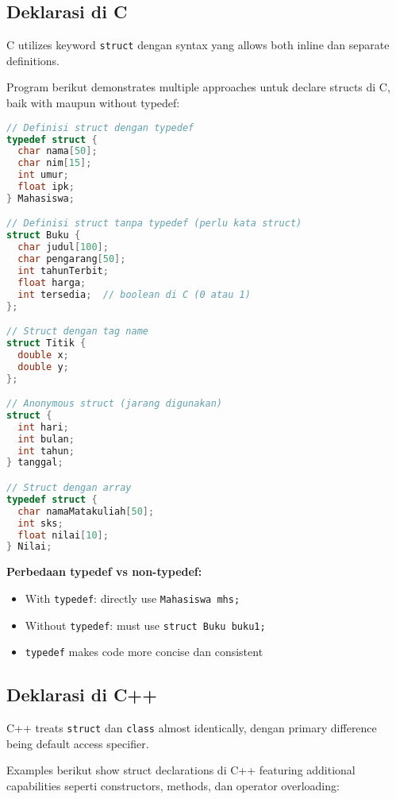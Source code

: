 \documentclass[../main.tex]{subfiles}
\begin{document}
\subsection{Deklarasi di C}

C utilizes keyword \texttt{struct} dengan syntax yang allows both inline dan separate definitions.

Program berikut demonstrates multiple approaches untuk declare structs di C, baik with maupun without typedef:

\begin{lstlisting}[language=C, caption={Deklarasi struct di C}]
// Definisi struct dengan typedef
typedef struct {
  char nama[50];
  char nim[15];
  int umur;
  float ipk;
} Mahasiswa;

// Definisi struct tanpa typedef (perlu kata struct)
struct Buku {
  char judul[100];
  char pengarang[50];
  int tahunTerbit;
  float harga;
  int tersedia;  // boolean di C (0 atau 1)
};

// Struct dengan tag name
struct Titik {
  double x;
  double y;
};

// Anonymous struct (jarang digunakan)
struct {
  int hari;
  int bulan;
  int tahun;
} tanggal;

// Struct dengan array
typedef struct {
  char namaMatakuliah[50];
  int sks;
  float nilai[10];
} Nilai;
\end{lstlisting}

\textbf{Perbedaan typedef vs non-typedef:}
\begin{itemize}
  \item With \texttt{typedef}: directly use \texttt{Mahasiswa mhs;}
  \item Without \texttt{typedef}: must use \texttt{struct Buku buku1;}
  \item \texttt{typedef} makes code more concise dan consistent
\end{itemize}

\subsection{Deklarasi di C++}

C++ treats \texttt{struct} dan \texttt{class} almost identically, dengan primary difference being default access specifier.

Examples berikut show struct declarations di C++ featuring additional capabilities seperti constructors, methods, dan operator overloading:
\end{document}
